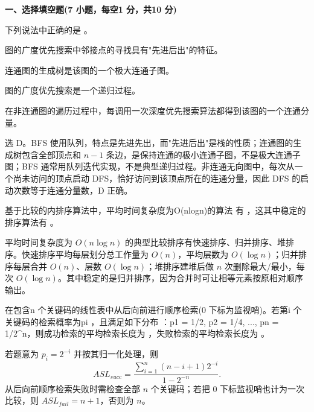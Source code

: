 

\textbf{一、选择填空题(7 小题，每空1 分，共10 分)}
\begin{question}
下列说法中正确的是 \blank。

\begin{choiceoptions}[1]
  \item 图的广度优先搜索中邻接点的寻找具有"先进后出"的特征。
  \item 连通图的生成树是该图的一个极大连通子图。
  \item 图的广度优先搜索是一个递归过程。
  \item 在非连通图的遍历过程中，每调用一次深度优先搜索算法都得到该图的一个连通分量。
\end{choiceoptions}

\begin{solution}
选 D。BFS 使用队列，特点是先进先出，而"先进后出"是栈的性质；连通图的生成树包含全部顶点和 $n-1$ 条边，是保持连通的极小连通子图，不是极大连通子图；BFS 通常用队列迭代实现，不是典型递归过程。非连通无向图中，每次从一个尚未访问的顶点启动 DFS，恰好访问到该顶点所在的连通分量，因此 DFS 的启动次数等于连通分量数，D 正确。
\end{solution}
\end{question}

\begin{question}
基于比较的内排序算法中，平均时间复杂度为O(nlogn)的算法 有 \blank，这其中稳定的排序算法有 \blank。

\begin{solution}
平均时间复杂度为 $O(n\log n)$ 的典型比较排序有快速排序、归并排序、堆排序。快速排序平均每层划分总工作量为 $O(n)$，平均层数为 $O(\log n)$；归并排序每层合并 $O(n)$、层数 $O(\log n)$；堆排序建堆后做 $n$ 次删除最大/最小，每次 $O(\log n)$。其中稳定的是归并排序，因为合并时可让相等元素按原相对顺序输出。
\end{solution}
\end{question}

\begin{question}
在包含n 个关键码的线性表中从后向前进行顺序检索(0 下标为监视哨)。若第i 个关键码的检索概率为pi ，且满足如下分布 ：p1 = 1/2, p2 = 1/4,  ..., pn = 1/2\^{}n，则成功检索的平均检索长度为 \blank，失败检索的平均检索长度为 \blank。

\begin{solution}
若题意为 $p_i=2^{-i}$ 并按其归一化处理，则
  \[
  ASL_{succ}=\frac{\sum_{i=1}^n (n-i+1)2^{-i}}{1-2^{-n}}.
  \]
  从后向前顺序检索失败时需检查全部 $n$ 个关键码；若把 0 下标监视哨也计为一次比较，则 $ASL_{fail}=n+1$，否则为 $n$。
\end{solution}
\end{question}

